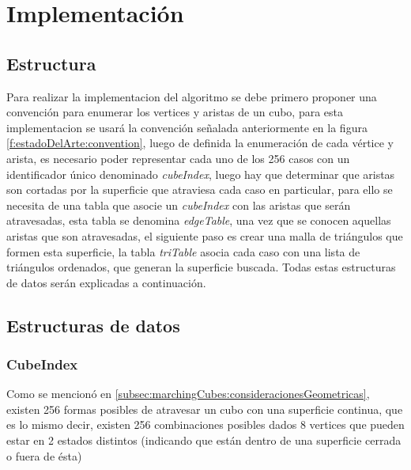 \chapter{Implementación}
\label{ch:implementacion}

\section{Estructura}
\label{ch:implementacion:sec:estructura}

Para realizar la implementacion del algoritmo se debe primero proponer una convención para enumerar los vertices y aristas de un cubo, para esta implementacion se usará la convención señalada anteriormente en la figura \ref{f:estadoDelArte:convention}, luego de definida la enumeración de cada vértice y arista, es necesario poder representar cada uno de los 256 casos con un identificador único denominado \emph{cubeIndex}, luego hay que determinar que aristas son cortadas por la superficie que atraviesa cada caso en particular, para ello se necesita de una tabla que asocie un \emph{cubeIndex} con las aristas que serán atravesadas, esta tabla se denomina \emph{edgeTable}, una vez que se conocen aquellas aristas que son atravesadas, el siguiente paso es crear una malla de triángulos que formen esta superficie, la tabla \emph{triTable} asocia cada caso con una lista de triángulos ordenados, que generan la superficie buscada. Todas estas estructuras de datos serán explicadas a continuación.

\section{Estructuras de datos}
\label{ch:implementacion:sec:estructurasDeDatos}

\subsection{CubeIndex}
\label{ch:implementacion:sec:CubeIndex}

Como se mencionó en \ref{subsec:marchingCubes:consideracionesGeometricas}, existen 256 formas posibles de atravesar un cubo con una superficie continua, que es lo mismo decir, existen 256 combinaciones posibles dados 8 vertices que pueden estar en 2 estados distintos (indicando que están dentro de una superficie cerrada o fuera de ésta)


